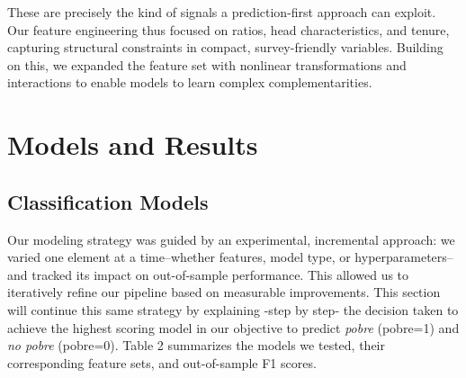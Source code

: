 \documentclass[12pt,a4paper,onecolumn]{article}
\begin{document}
These are precisely the kind of signals a prediction-first approach can exploit. Our feature engineering thus focused on ratios, head characteristics, and tenure, capturing structural constraints in compact, survey-friendly variables. Building on this, we expanded the feature set with nonlinear transformations and interactions to enable models to learn complex complementarities.
 

\section{Models and Results}

\subsection{Classification Models}
Our modeling strategy was guided by an experimental, incremental approach: we varied one element at a time--whether features, model type, or hyperparameters--and tracked its impact on out-of-sample performance. This allowed us to iteratively refine our pipeline based on measurable improvements. This section will continue this same strategy by explaining -step by step- the decision taken to achieve the highest scoring model in our objective to predict \textit{pobre} (pobre=1) and \textit{no pobre} (pobre=0). Table 2 summarizes the models we tested, their corresponding feature sets, and out-of-sample F1 scores.
\end{document}
